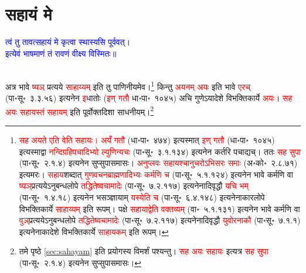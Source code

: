 \section[सहायं मे]{सहायं मे}
\label{sec:sahayam_me}
\centering\textcolor{blue}{त्वं तु तावत्सहायं मे कृत्वा स्थास्यसि पूर्ववत्।\nopagebreak\\
इत्येवं भाषमाणं तं रावणं वीक्ष्य विस्मितः॥}\nopagebreak\\
\\
\begin{sloppypar}\justifying\noindent\hspace{10mm} अत्र भावे \textcolor{red}{ष्यञ्} प्रत्यये \textcolor{red}{साहाय्यम्} इति तु पाणिनीयमेव।\footnote{\textcolor{red}{सह अयते एति वेति सहायः।} \textcolor{red}{अयँ गतौ} (धा॰पा॰~४७४) इत्यस्मात् \textcolor{red}{इण् गतौ} (धा॰पा॰~१०४५) इत्यस्माद्वा \textcolor{red}{नन्दि\-ग्रहि\-पचादिभ्यो ल्युणिन्यचः} (पा॰सू॰~३.१.१३४) इत्यनेन कर्तरि पचाद्यच्। ततः \textcolor{red}{सह सुपा} (पा॰सू॰~२.१.४) इत्यनेन सुप्सुपा\-समासः। \textcolor{red}{अनुप्लवः सहायश्चानुचरोऽभिसरः समाः} (अ॰को॰~२.८.७१) इत्यमरः। \textcolor{red}{सहाय}\-शब्दात् \textcolor{red}{गुण\-वचन\-ब्राह्मणादिभ्यः कर्मणि च} (पा॰सू॰~५.१.१२४) इत्यनेन भावे कर्मणि वा \textcolor{red}{ष्यञ्‌}\-प्रत्ययेऽनुबन्ध\-लोपे \textcolor{red}{तद्धितेष्वचामादेः} (पा॰सू॰~७.२.११७) इत्यनेनादि\-वृद्धौ \textcolor{red}{यचि भम्} (पा॰सू॰~१.४.१८) इत्यनेन भसञ्ज्ञायाम् \textcolor{red}{यस्येति च} (पा॰सू॰~६.४.१४८) इत्यनेनाकार\-लोपे विभक्तिकार्ये \textcolor{red}{साहाय्यम्} इति रूपम्। पक्षे \textcolor{red}{सहायाद्वेति वक्तव्यम्} (वा॰~५.१.१३१) इत्यनेन भावे कर्मणि वा \textcolor{red}{वुञ्‌}\-प्रत्ययेऽनुबन्ध\-लोपे \textcolor{red}{तद्धितेष्वचामादेः} (पा॰सू॰~७.२.११७) इत्यनेनादि\-वृद्धौ \textcolor{red}{युवोरनाकौ} (पा॰सू॰~७.१.१) इत्यनेनाकादेशे विभक्तिकार्ये \textcolor{red}{साहायकम्} इति रूपम्।} किन्तु \textcolor{red}{अयनम् अयः} इति भावे \textcolor{red}{एरच्} (पा॰सू॰~३.३.५६) इत्यनेन \textcolor{red}{इ}\-धातोः (\textcolor{red}{इण् गतौ} धा॰पा॰~१०४५) अचि गुणेऽयादेशे विभक्ति\-कार्ये \textcolor{red}{अयः}। \textcolor{red}{सह अयः सहायस्तं सहायम्} इति पूर्वोक्त\-दिशा साधनीयम्।\footnote{\pageref{sec:sahayam}तमे पृष्ठे \ref{sec:sahayam}  इति प्रयोगस्य विमर्शं पश्यन्तु। \textcolor{red}{सह अयः सहायः} इत्यत्र \textcolor{red}{सह सुपा} (पा॰सू॰~२.१.४) इत्यनेन सुप्सुपा\-समासः।}\end{sloppypar}
